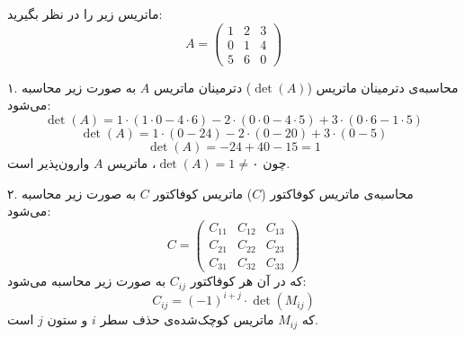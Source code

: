 \begin{scriptsize}
\begin{example}

	
	
	ماتریس زیر را در نظر بگیرید:
	\[
	A = \begin{pmatrix}
		1 & 2 & 3 \\
		0 & 1 & 4 \\
		5 & 6 & 0
	\end{pmatrix}
	\]
	

	
	 ۱. محاسبه‌ی دترمینان ماتریس (\( \det(A) \))
	دترمینان ماتریس \( A \) به صورت زیر محاسبه می‌شود:
	\[
	\det(A) = 1 \cdot (1 \cdot 0 - 4 \cdot 6) - 2 \cdot (0 \cdot 0 - 4 \cdot 5) + 3 \cdot (0 \cdot 6 - 1 \cdot 5)
	\]
	\[
	\det(A) = 1 \cdot (0 - 24) - 2 \cdot (0 - 20) + 3 \cdot (0 - 5)
	\]
	\[
	\det(A) = -24 + 40 - 15 = 1
	\]
	چون \( \det(A) = 1 \neq ۰ \)، ماتریس \( A \) وارون‌پذیر است.
	

	
	 ۲. محاسبه‌ی ماتریس کوفاکتور (\( C \))
	ماتریس کوفاکتور \( C \) به صورت زیر محاسبه می‌شود:
	\[
	C = \begin{pmatrix}
		C_{11} & C_{12} & C_{13} \\
		C_{21} & C_{22} & C_{23} \\
		C_{31} & C_{32} & C_{33}
	\end{pmatrix}
	\]
	که در آن هر کوفاکتور \( C_{ij} \) به صورت زیر محاسبه می‌شود:
	\[
	C_{ij} = (-1)^{i+j} \cdot \det(M_{ij})
	\]
	که \( M_{ij} \) ماتریس کوچک‌شده‌ی حذف سطر \( i \) و ستون \( j \) است.
	

\end{example}
\end{scriptsize}
